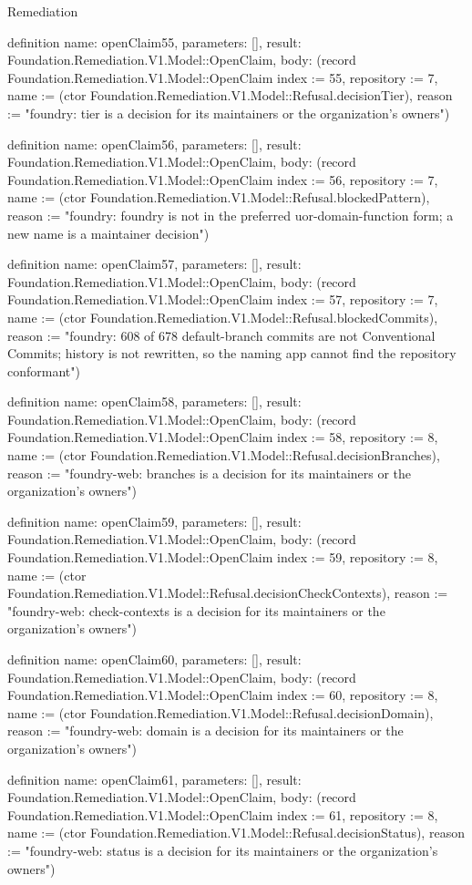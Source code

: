 \begin{lexlean}{Remediation}
\begin{semanticmodule}
definition{
  name: openClaim55,
  parameters: [],
  result: Foundation.Remediation.V1.Model::OpenClaim,
  body: (record Foundation.Remediation.V1.Model::OpenClaim {index := 55, repository := 7, name := (ctor Foundation.Remediation.V1.Model::Refusal.decisionTier), reason := "foundry: tier is a decision for its maintainers or the organization's owners"})
}

definition{
  name: openClaim56,
  parameters: [],
  result: Foundation.Remediation.V1.Model::OpenClaim,
  body: (record Foundation.Remediation.V1.Model::OpenClaim {index := 56, repository := 7, name := (ctor Foundation.Remediation.V1.Model::Refusal.blockedPattern), reason := "foundry: foundry is not in the preferred uor-{domain}-{function} form; a new name is a maintainer decision"})
}

definition{
  name: openClaim57,
  parameters: [],
  result: Foundation.Remediation.V1.Model::OpenClaim,
  body: (record Foundation.Remediation.V1.Model::OpenClaim {index := 57, repository := 7, name := (ctor Foundation.Remediation.V1.Model::Refusal.blockedCommits), reason := "foundry: 608 of 678 default-branch commits are not Conventional Commits; history is not rewritten, so the naming app cannot find the repository conformant"})
}

definition{
  name: openClaim58,
  parameters: [],
  result: Foundation.Remediation.V1.Model::OpenClaim,
  body: (record Foundation.Remediation.V1.Model::OpenClaim {index := 58, repository := 8, name := (ctor Foundation.Remediation.V1.Model::Refusal.decisionBranches), reason := "foundry-web: branches is a decision for its maintainers or the organization's owners"})
}

definition{
  name: openClaim59,
  parameters: [],
  result: Foundation.Remediation.V1.Model::OpenClaim,
  body: (record Foundation.Remediation.V1.Model::OpenClaim {index := 59, repository := 8, name := (ctor Foundation.Remediation.V1.Model::Refusal.decisionCheckContexts), reason := "foundry-web: check-contexts is a decision for its maintainers or the organization's owners"})
}

definition{
  name: openClaim60,
  parameters: [],
  result: Foundation.Remediation.V1.Model::OpenClaim,
  body: (record Foundation.Remediation.V1.Model::OpenClaim {index := 60, repository := 8, name := (ctor Foundation.Remediation.V1.Model::Refusal.decisionDomain), reason := "foundry-web: domain is a decision for its maintainers or the organization's owners"})
}

definition{
  name: openClaim61,
  parameters: [],
  result: Foundation.Remediation.V1.Model::OpenClaim,
  body: (record Foundation.Remediation.V1.Model::OpenClaim {index := 61, repository := 8, name := (ctor Foundation.Remediation.V1.Model::Refusal.decisionStatus), reason := "foundry-web: status is a decision for its maintainers or the organization's owners"})
}


\end{semanticmodule}
\end{lexlean}
